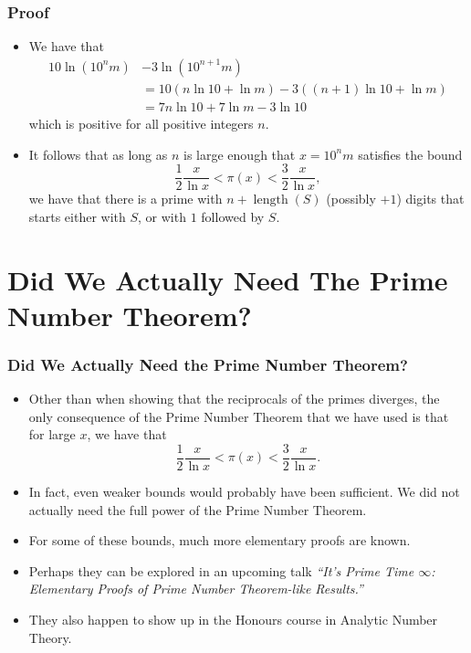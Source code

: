 \documentclass{beamer}
\begin{document}
\begin{frame}
    \frametitle{Proof}

    \begin{itemize}
        \item We have that
        \begin{align*}
            10 \ln\left( 10^n m \right) & - 3 \ln\left( 10^{n + 1} m \right) \\
            & = 10\left( n \ln 10 + \ln m \right) - 3\left( (n + 1) \ln 10  + \ln m \right) \\
            & = 7n \ln 10 + 7 \ln m - 3 \ln 10
        \end{align*}
        which is positive for all positive integers $n$. \pause
        \item It follows that as long as $n$ is large enough that $x = 10^n m$ satisfies the bound
        \[
            \frac{1}{2} \frac{x}{\ln x} < \pi(x) < \frac{3}{2} \frac{x}{\ln x},
        \]
        we have that there is a prime with $n + \operatorname{length}(S)$ (possibly $+ 1$) digits that starts either with $S$, or with $1$ followed by $S$.
    \end{itemize}

\end{frame}

\section{Did We Actually Need The Prime Number Theorem?}

\begin{frame}
    \frametitle{Did We Actually Need the Prime Number Theorem?}

    \begin{itemize}
        \item Other than when showing that the reciprocals of the primes diverges, the only consequence of the Prime Number Theorem that we have used is that for large $x$, we have that
        \[
            \frac{1}{2} \frac{x}{\ln x} < \pi(x) < \frac{3}{2} \frac{x}{\ln x}.
        \]
        \pause
        \item In fact, even weaker bounds would probably have been sufficient. We did not actually need the full power of the Prime Number Theorem. \pause
        \item For some of these bounds, much more elementary proofs are known. \pause
        \item Perhaps they can be explored in an upcoming talk \emph{``It's Prime Time $\infty$: Elementary Proofs of Prime Number Theorem-like Results.''} \pause
        \item They also happen to show up in the Honours course in Analytic Number Theory.
    \end{itemize}

\end{frame}
\end{document}
